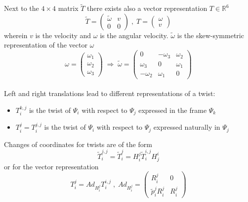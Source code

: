 \documentclass[a4paper,twoside, openright,12pt]{report}
\begin{document}
Next to the $4  \times 4$ matrix $\tilde{T} $ there exists also a vector representation $T\in \mathbb{R}^6$
\begin{equation}
 \tilde{T} = \begin{pmatrix}\tilde{\omega} & v \\ 0 & 0\end{pmatrix} \; , \; T = \begin{pmatrix}\omega \\ v\end{pmatrix} \end{equation}
wherein $v$ is the velocity and $\omega$ is the angular velocity. $\tilde{\omega}$ is the skew-symmetric representation of the vector $\omega$
\begin{equation}\label{EQ:skewsymmetricop}
\omega = \begin{pmatrix}
\omega_1 \\ \omega_2 \\ \omega_3\end{pmatrix} \; \Rightarrow \; \tilde{\omega} = \begin{pmatrix}0 & -\omega_3 & \omega_2 \\ \omega_3 & 0 & \omega_1 \\ -\omega_2 & \omega_1 & 0\end{pmatrix} \end{equation} \\

Left and right translations lead to different representations of a twist:
\begin{itemize}
\item $T_i^{k,j}$ is the twist of $\Psi_i$ with respect to $\Psi_j$ expressed in the frame $\Psi_k$
\item $T_i^j = T_i^{j,j}$ is the twist of $\Psi_i$ with respect to $\Psi_j$ expressed naturally in $\Psi_j$ 
\end{itemize}

Changes of coordinates for twists are of the form 
\begin{equation}
\tilde{T}_i^{j,j} = \tilde{T}_i^{j} = H_i^j \tilde{T}_i^{i,j} H_j^i\end{equation}
or for the vector representation
\begin{equation}
 T_i^{j} = Ad_{H_i^j} T_i^{i,j} \; , \;
Ad_{H_i^j} = \begin{pmatrix}R_i^j & 0 \\ \tilde{p}_i^j R_i^j & R_i^j\end{pmatrix} \end{equation}
\end{document}
